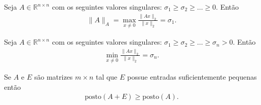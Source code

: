 \begin{theorem}
    Seja $A \in \mathbb{R}^{n \times n}$ com os seguintes valores singulares: $\sigma_1 \geq \sigma_2 \geq \ldots \geq 0$. Ent\~{a}o 
    \begin{align*}
        \| A \|_A = \max_{x \neq 0} \frac{\| A x \|_2}{\| x \|_2} = \sigma_1.
    \end{align*}
\end{theorem}
\begin{theorem}
    Seja $A \in \mathbb{R}^{n \times n}$ com os seguintes valores singulares: $\sigma_1 \geq \sigma_2 \geq \ldots \geq \sigma_n > 0$. Ent\~{a}o 
    \begin{align*}
        \min_{x \neq 0} \frac{\| A x \|_2}{\| x \|_2} = \sigma_n.
    \end{align*}
\end{theorem}
\begin{theorem}
    Se $A$ e $E$ s\~{a}o matrizes $m \times n$ tal que $E$ possue entradas suficientemente pequenas ent\~{a}o
    \begin{align*}
        \mathrm{posto}(A + E) \geq \mathrm{posto}(A).
    \end{align*}
\end{theorem}
